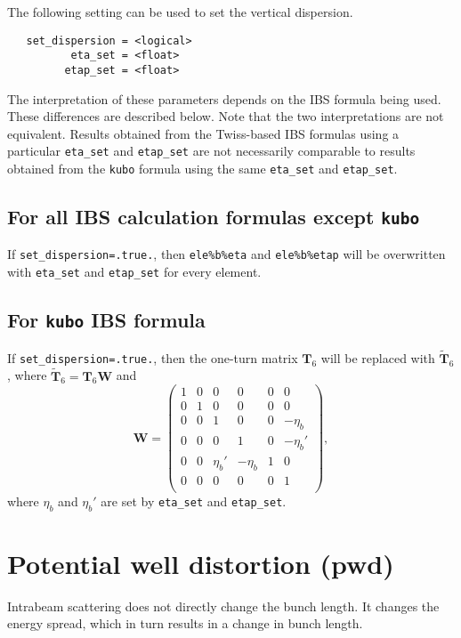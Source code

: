 \documentclass[11pt]{article}
\begin{document}
The following setting can be used to set the vertical dispersion.
\begin{verbatim}
   set_dispersion = <logical>
          eta_set = <float>
         etap_set = <float>
\end{verbatim}

The interpretation of these parameters depends on the IBS formula being used.  These differences 
are described below.  Note that the two interpretations are not equivalent.  Results obtained
from the Twiss-based IBS formulas using a particular {\tt eta_set} and {\tt etap_set} are
not necessarily comparable to results obtained from the {\tt kubo} formula using the
same {\tt eta_set} and {\tt etap_set}.

\subsection{For all IBS calculation formulas except {\tt kubo}}
If {\tt set_dispersion=.true.}, then {\tt ele\%b\%eta} and {\tt ele\%b\%etap} will be overwritten
with {\tt eta_set} and {\tt etap_set} for every element.

\subsection{For {\tt kubo} IBS formula}
If {\tt set_dispersion=.true.}, then the one-turn matrix $\mathbf{T}_6$ will be replaced
with $\mathbf{\tilde{T}}_6$, where $\mathbf{\tilde{T}}_6=\mathbf{T}_6\mathbf{W}$ and
\begin{equation}
\mathbf{W}=\begin{pmatrix}
1&0&0&0&0&0\\
0&1&0&0&0&0\\
0&0&1&0&0&-\eta_b\\
0&0&0&1&0&-\eta_b'\\
0&0&\eta_b'&-\eta_b&1&0\\
0&0&0&0&0&1\\
\end{pmatrix},
\end{equation}
where $\eta_b$ and $\eta_b'$ are set by {\tt eta_set} and {\tt etap_set}.

\section{Potential well distortion (pwd)}
Intrabeam scattering does not directly change the bunch length.  It changes the energy spread,
which in turn results in a change in bunch length.
\end{document}

